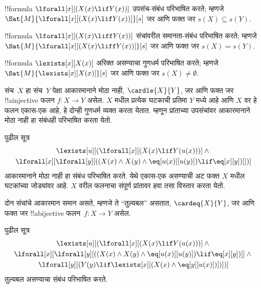 \documentclass[../../../include/open-logic-section]{subfiles}
\begin{document}


\begin{prop}
!!{formula} $\lforall[x][(X(x) \lif Y(x))]$ उपसंच-संबंध
परिभाषित करते; म्हणजे
$\Sat{M}{\lforall[x][(X(x) \lif Y(x))]}[s]$
जर आणि फक्त जर $s(X) \subseteq s(Y)$.
\end{prop}

\begin{prop}
!!{formula} $\lforall[x][(X(x) \liff Y(x))]$ संचांवरील
समानता-संबंध परिभाषित करते; म्हणजे
$\Sat{M}{\lforall[x][(X(x) \liff Y(x))]}[s]$
जर आणि फक्त जर $s(X) = s(Y)$.
\end{prop}

\begin{prop}
!!{formula} $\lexists[x][X(x)]$ अरिक्त असण्याचा
गुणधर्म परिभाषित करते; म्हणजे
$\Sat{M}{\lexists[x][X(x)]}[s]$
जर आणि फक्त जर $s(X) \neq \emptyset$.
\end{prop}

संच~$X$ हा संच~$Y$ पेक्षा आकारमानाने मोठा नाही,
$\cardle{X}{Y}$, जर आणि फक्त जर
!!a{injective} फलन $f\colon X \to Y$ असेल.
$X$ मधील प्रत्येक घटकाची प्रतिमा $Y$ मध्ये आहे आणि $X$ वर हे फलन
एकास-एक आहे, हे दोन्ही गुणधर्म व्यक्त करता येतात.
म्हणून प्रांताच्या उपसंचांवर आकारमानाने मोठा नाही
हा संबंधही परिभाषित करता येतो.

\begin{prop}
पुढील सूत्र
\begin{multline*}
\lexists[u][(\lforall[x][(X(x) \lif Y(u(x)))] \land {}\\
\lforall[x][\lforall[y][((X(x) \land X(y) \land \eq[u(x)][u(y)]) \lif
      \eq[x][y])]])]
\end{multline*}
आकारमानाने मोठा नाही हा संबंध परिभाषित करते. येथे
एकास-एक असण्याची अट फक्त $X$ मधील घटकांच्या जोड्यांवर आहे.
$X$ वरील फलनाचा संपूर्ण प्रांतावर हवा तसा विस्तार करता येतो.
\end{prop}

दोन संचांचे आकारमान समान असते, म्हणजे ते
``तुल्यबल'' असतात, $\cardeq{X}{Y}$, जर आणि
फक्त जर !!a{bijective} फलन~$f\colon X \to Y$ असेल.

\begin{prop}
पुढील सूत्र
\begin{multline*}
  \lexists[u][(\lforall[x][(X(x) \lif Y(u(x)))] \land {}\\
    \lforall[x][\lforall[y][((X(x) \land X(y) \land \eq[u(x)][u(y)]) \lif \eq[x][y])]]
  \land {} \\\lforall[y][(Y(y) \lif \lexists[x][(X(x)
      \land \eq[y][u(x)])])])]
\end{multline*}
तुल्यबल असण्याचा संबंध परिभाषित करते.
\end{prop}
\end{document}
